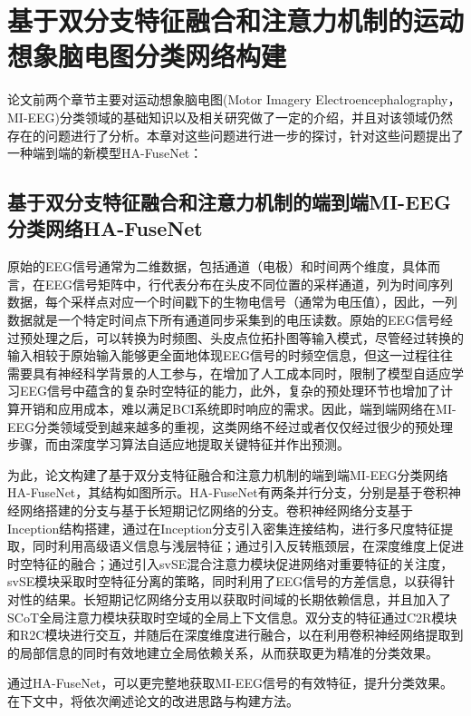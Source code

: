 
\chapter{基于双分支特征融合和注意力机制的运动想象脑电图分类网络构建}

论文前两个章节主要对运动想象脑电图(Motor Imagery Electroencephalography，MI-EEG)分类领域的基础知识以及相关研究做了一定的介绍，并且对该领域仍然存在的问题进行了分析。本章对这些问题进行进一步的探讨，针对这些问题提出了一种端到端的新模型HA-FuseNet：

\section{基于双分支特征融合和注意力机制的端到端MI-EEG分类网络HA-FuseNet}

原始的EEG信号通常为二维数据，包括通道（电极）和时间两个维度，具体而言，在EEG信号矩阵中，行代表分布在头皮不同位置的采样通道，列为时间序列数据，每个采样点对应一个时间戳下的生物电信号（通常为电压值），因此，一列数据就是一个特定时间点下所有通道同步采集到的电压读数。原始的EEG信号经过预处理之后，可以转换为时频图、头皮点位拓扑图等输入模式，尽管经过转换的输入相较于原始输入能够更全面地体现EEG信号的时频空信息，但这一过程往往需要具有神经科学背景的人工参与，在增加了人工成本同时，限制了模型自适应学习EEG信号中蕴含的复杂时空特征的能力，此外，复杂的预处理环节也增加了计算开销和应用成本，难以满足BCI系统即时响应的需求。因此，端到端网络在MI-EEG分类领域受到越来越多的重视，这类网络不经过或者仅仅经过很少的预处理步骤，而由深度学习算法自适应地提取关键特征并作出预测。

为此，论文构建了基于双分支特征融合和注意力机制的端到端MI-EEG分类网络HA-FuseNet，其结构如图所示。HA-FuseNet有两条并行分支，分别是基于卷积神经网络搭建的分支与基于长短期记忆网络的分支。卷积神经网络分支基于Inception结构搭建，通过在Inception分支引入密集连接结构，进行多尺度特征提取，同时利用高级语义信息与浅层特征；通过引入反转瓶颈层，在深度维度上促进时空特征的融合；通过引入svSE混合注意力模块促进网络对重要特征的关注度，svSE模块采取时空特征分离的策略，同时利用了EEG信号的方差信息，以获得针对性的结果。长短期记忆网络分支用以获取时间域的长期依赖信息，并且加入了SCoT全局注意力模块获取时空域的全局上下文信息。双分支的特征通过C2R模块和R2C模块进行交互，并随后在深度维度进行融合，以在利用卷积神经网络提取到的局部信息的同时有效地建立全局依赖关系，从而获取更为精准的分类效果。

通过HA-FuseNet，可以更完整地获取MI-EEG信号的有效特征，提升分类效果。在下文中，将依次阐述论文的改进思路与构建方法。


